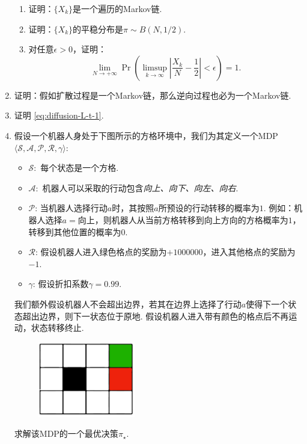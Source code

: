 \begin{enumerate}[fullwidth]
    \begin{enumerate}
        \item 证明：$\{X_k\}$是一个遍历的Markov链.
        \item 证明：$\{X_k\}$的平稳分布是$\pi\sim B(N,1/2)$.
        \item 对任意$\epsilon>0$，证明：
        \[
            \lim_{N\to+\infty}\Pr\left(\limsup_{k\to\infty}\left|\frac{X_k}{N}-\frac{1}{2}\right|<\epsilon\right)=1.
        \]
    \end{enumerate}

    \item \label{exercise:diffusion-well-defined} 证明：假如扩散过程是一个Markov链，那么逆向过程也必为一个Markov链.
    
    \item \label{exercise:diffusion-L-t-1} 证明 \eqref{eq:diffusion-L-t-1}.
    
    \item 假设一个机器人身处于下图所示的方格环境中，我们为其定义一个MDP $\langle\mathcal S,\mathcal A,\mathcal P,\mathcal R,\gamma\rangle$:
    \begin{itemize}
        \item $\mathcal S:$ 每个状态是一个方格.
        \item $\mathcal A:$ 机器人可以采取的行动包含\emph{向上、向下、向左、向右}.
        \item $\mathcal P$: 当机器人选择行动$a$时，其按照$a$所预设的行动转移的概率为$1$. 例如：机器人选择$a=\text{向上}$，则机器人从当前方格转移到向上方向的方格概率为$1$，转移到其他位置的概率为$0$.
        \item $\mathcal R$: 假设机器人进入绿色格点的奖励为$+1000000$，进入其他格点的奖励为$-1$.
        \item $\gamma$: 假设折扣系数$\gamma=0.99$.
    \end{itemize}
    我们额外假设机器人不会超出边界，若其在边界上选择了行动$a$使得下一个状态超出边界，则下一状态位于原地. 假设机器人进入带有颜色的格点后不再运动，状态转移终止.
    \begin{figure}[h]
        \centering
        \includegraphics[width=0.4\textwidth]{figures/Markov-chain/exercise-mdp.pdf}
    \end{figure}
    
    求解该MDP的一个最优决策$\pi_\star$.
\end{enumerate}